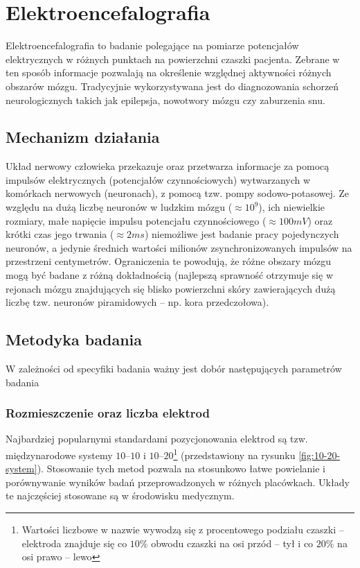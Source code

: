 \documentclass{./assets/wfis}
\begin{document}
\section{Elektroencefalografia}
Elektroencefalografia to badanie polegające na pomiarze potencjałów elektrycznych w różnych punktach na powierzchni czaszki pacjenta. Zebrane w ten sposób informacje pozwalają na określenie względnej aktywności różnych obszarów mózgu. Tradycyjnie wykorzystywana jest do diagnozowania schorzeń neurologicznych takich jak epilepsja, nowotwory mózgu czy zaburzenia snu.

\subsection{Mechanizm działania}
Układ nerwowy człowieka przekazuje oraz przetwarza informacje za pomocą impulsów elektrycznych (potencjałów czynnościowych) wytwarzanych w komórkach nerwowych (neuronach), z pomocą tzw. pompy sodowo-potasowej. Ze względu na dużą liczbę neuronów w ludzkim mózgu ($\approx10^9$\cite{herculano-houzel_human_2009}), ich niewielkie rozmiary, małe napięcie impulsu potencjału czynnościowego ($\approx100mV$\cite{biga_anatomy_2019}) oraz krótki czas jego trwania ($\approx2ms$\cite{biga_anatomy_2019}) niemożliwe jest badanie pracy pojedynczych neuronów, a jedynie średnich wartości milionów zsynchronizowanych impulsów na przestrzeni centymetrów. Ograniczenia te powodują, że różne obszary mózgu mogą być badane z różną dokładnością (najlepszą sprawność otrzymuje się w rejonach mózgu znajdujących się blisko powierzchni skóry zawierających dużą liczbę tzw. neuronów piramidowych – np. kora przedczołowa).

\subsection{Metodyka badania}
W zależności od specyfiki badania ważny jest dobór następujących parametrów badania 

\subsubsection{Rozmieszczenie oraz liczba elektrod}
Najbardziej popularnymi standardami pozycjonowania elektrod są tzw. międzynarodowe systemy $10$–$10$ i $10$–$20$\footnote{Wartości liczbowe w nazwie wywodzą się  z procentowego podziału czaszki – elektroda znajduje się co $10\%$ obwodu czaszki na osi przód – tył i co $20\%$ na osi prawo – lewo} \cite{herbert_h_jasper_report_1958} (przedstawiony na rysunku \ref{fig:10-20-system}). Stosowanie tych metod pozwala na stosunkowo łatwe powielanie i porównywanie wyników badań przeprowadzonych w różnych placówkach. Układy te najczęściej stosowane są w środowisku medycznym. 
\end{document}
